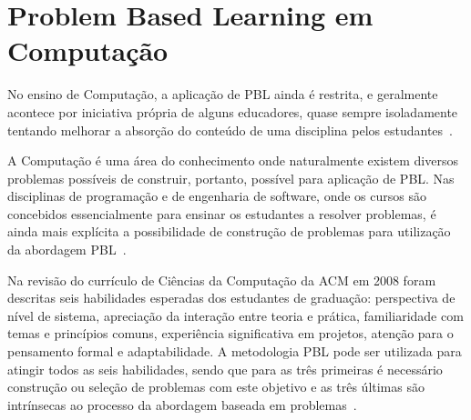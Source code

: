 \section{Problem Based Learning em Computação}
\label{sec-revisao-pbl-computacao}
No ensino de Computação, a aplicação de PBL ainda é restrita, e geralmente
acontece por iniciativa própria de alguns educadores,
quase sempre isoladamente tentando melhorar a
absorção do conteúdo de uma disciplina
pelos estudantes~\cite{wood2003problem, o2012practical}.

A Computação é uma área do conhecimento onde naturalmente existem
diversos problemas possíveis de construir, portanto, possível para
aplicação de PBL.
Nas disciplinas de programação e de engenharia de software, onde os
cursos são concebidos essencialmente para ensinar os estudantes
a resolver problemas, é ainda mais explícita a possibilidade
de construção de problemas para utilização da abordagem
PBL~\cite{fee2010teaching}.

Na revisão do currículo de Ciências da Computação da ACM em 2008
foram descritas seis habilidades esperadas dos estudantes
de graduação: perspectiva de nível de sistema,
apreciação da interação entre teoria e prática,
familiaridade com temas e princípios comuns,
experiência significativa em projetos,
atenção para o pensamento formal e
adaptabilidade.
A metodologia PBL pode ser utilizada para atingir
todos as seis habilidades, sendo que para as três primeiras
é necessário construção ou seleção de problemas com este objetivo e 
as três últimas são intrínsecas ao processo da abordagem baseada
em problemas~\cite{cassel2008computer}.
